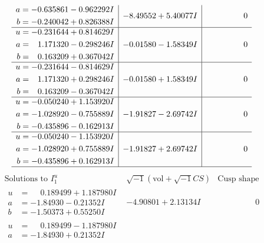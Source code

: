 \documentclass[1p]{elsarticle_modified}
\theoremstyle{definition}
\newcommand{\I}{\sqrt{-1}}
\begin{document}
$$\begin{array}{c|c|c}
\begin{aligned}
a &= -0.635861 - 0.962292 I \\
b &= -0.240042 + 0.826388 I\end{aligned}
 & -8.49552 + 5.40077 I & \phantom{-0.000000 } 0 \\ \hline\begin{aligned}
u &= -0.231644 + 0.814629 I \\
a &= \phantom{-}1.171320 - 0.298246 I \\
b &= \phantom{-}0.163209 + 0.367042 I\end{aligned}
 & -0.01580 - 1.58349 I & \phantom{-0.000000 } 0 \\ \hline\begin{aligned}
u &= -0.231644 - 0.814629 I \\
a &= \phantom{-}1.171320 + 0.298246 I \\
b &= \phantom{-}0.163209 - 0.367042 I\end{aligned}
 & -0.01580 + 1.58349 I & \phantom{-0.000000 } 0 \\ \hline\begin{aligned}
u &= -0.050240 + 1.153920 I \\
a &= -1.028920 - 0.755889 I \\
b &= -0.435896 - 0.162913 I\end{aligned}
 & -1.91827 - 2.69742 I & \phantom{-0.000000 } 0 \\ \hline\begin{aligned}
u &= -0.050240 - 1.153920 I \\
a &= -1.028920 + 0.755889 I \\
b &= -0.435896 + 0.162913 I\end{aligned}
 & -1.91827 + 2.69742 I & \phantom{-0.000000 } 0\\
 \hline 
 \end{array}$$\newpage$$\begin{array}{c|c|c}  
\text{Solutions to }I^u_{1}& \I (\text{vol} + \sqrt{-1}CS) & \text{Cusp shape}\\
 \hline 
\begin{aligned}
u &= \phantom{-}0.189499 + 1.187980 I \\
a &= -1.84930 - 0.21352 I \\
b &= -1.50373 + 0.55250 I\end{aligned}
 & -4.90801 + 2.13134 I & \phantom{-0.000000 } 0 \\ \hline\begin{aligned}
u &= \phantom{-}0.189499 - 1.187980 I \\
a &= -1.84930 + 0.21352 I \\

\end{aligned}
\end{array}$$
\end{document}
